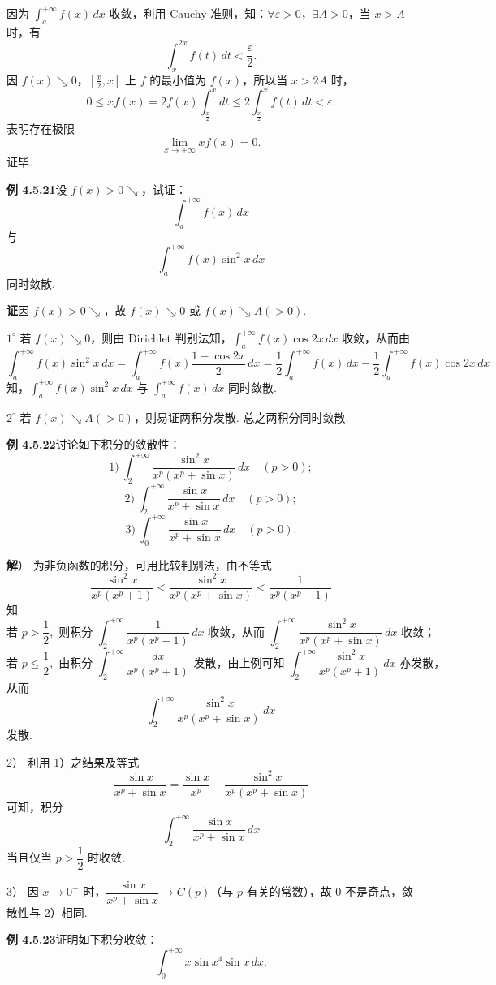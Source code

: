 \documentclass[UTF8,12pt,a4paper,fontset=fandol]{ctexart}
\begin{document}
因为 $\displaystyle\int_a^{+\infty}f(x)\,dx$ 收敛，利用 Cauchy 准则，知：$\forall\varepsilon>0$，$\exists A>0$，当 $x>A$ 时，有
\[
\int_x^{2x}f(t)\,dt<\frac\varepsilon2.
\]
因 $f(x)\searrow0$，$[\frac x2,x]$ 上 $f$ 的最小值为 $f(x)$，所以当 $x>2A$ 时，
\[
0\le xf(x)=2f(x)\int_{\frac x2}^xdt
\le2\int_{\frac x2}^xf(t)\,dt<\varepsilon.
\]
表明存在极限
\[
\lim_{x\to+\infty}xf(x)=0.
\]
证毕.

\noindent\textbf{例 4.5.21}\quad 设 $f(x)>0\searrow$，试证：
\[
\int_a^{+\infty}f(x)\,dx
\]
与
\[
\int_a^{+\infty}f(x)\sin^2x\,dx
\]
同时敛散.

\noindent\textbf{证}\quad 因 $f(x)>0\searrow$，故 $f(x)\searrow0$ 或 $f(x)\searrow A(>0)$.

$1^\circ$ 若 $f(x)\searrow0$，则由 Dirichlet 判别法知，$\displaystyle\int_a^{+\infty}f(x)\cos2x\,dx$ 收敛，从而由
\[
\int_a^{+\infty}f(x)\sin^2x\,dx
=\int_a^{+\infty}f(x)\frac{1-\cos2x}{2}\,dx
=\frac12\int_a^{+\infty}f(x)\,dx
-\frac12\int_a^{+\infty}f(x)\cos2x\,dx
\]
知，$\displaystyle\int_a^{+\infty}f(x)\sin^2x\,dx$ 与 $\displaystyle\int_a^{+\infty}f(x)\,dx$ 同时敛散.

$2^\circ$ 若 $f(x)\searrow A(>0)$，则易证两积分发散. 总之两积分同时敛散.

\noindent\textbf{例 4.5.22}\quad 讨论如下积分的敛散性：
\[
1)\ \int_2^{+\infty}\frac{\sin^2x}{x^p(x^p+\sin x)}\,dx\quad(p>0);
\]
\[
2)\ \int_2^{+\infty}\frac{\sin x}{x^p+\sin x}\,dx\quad(p>0);
\]
\[
3)\ \int_0^{+\infty}\frac{\sin x}{x^p+\sin x}\,dx\quad(p>0).
\]

\noindent\textbf{解}） 为非负函数的积分，可用比较判别法，由不等式
\[
\frac{\sin^2x}{x^p(x^p+1)}
<\frac{\sin^2x}{x^p(x^p+\sin x)}
<\frac1{x^p(x^p-1)}
\]
知
\[
\text{若 }p>\frac12,\text{ 则积分 }\int_2^{+\infty}\frac1{x^p(x^p-1)}\,dx\text{ 收敛，从而 }
\int_2^{+\infty}\frac{\sin^2x}{x^p(x^p+\sin x)}\,dx\text{ 收敛；}
\]
\[
\text{若 }p\le\frac12,\text{ 由积分 }\int_2^{+\infty}\frac{dx}{x^p(x^p+1)}\text{ 发散，由上例可知 }
\int_2^{+\infty}\frac{\sin^2x}{x^p(x^p+1)}\,dx\text{ 亦发散，}
\]
从而
\[
\int_2^{+\infty}\frac{\sin^2x}{x^p(x^p+\sin x)}\,dx
\]
发散.

2） 利用 1）之结果及等式
\[
\frac{\sin x}{x^p+\sin x}
=\frac{\sin x}{x^p}
-\frac{\sin^2x}{x^p(x^p+\sin x)}
\]
可知，积分
\[
\int_2^{+\infty}\frac{\sin x}{x^p+\sin x}\,dx
\]
当且仅当 $p>\dfrac12$ 时收敛.

3） 因 $x\to0^+$ 时，$\dfrac{\sin x}{x^p+\sin x}\to C(p)$（与 $p$ 有关的常数），故 $0$ 不是奇点，敛散性与 2）相同.

\noindent\textbf{例 4.5.23}\quad 证明如下积分收敛：
\[
\int_0^{+\infty}x\sin x^4\sin x\,dx.
\]
\end{document}
